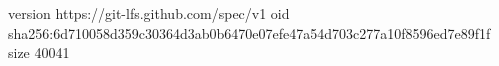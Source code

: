 version https://git-lfs.github.com/spec/v1
oid sha256:6d710058d359c30364d3ab0b6470e07efe47a54d703c277a10f8596ed7e89f1f
size 40041
